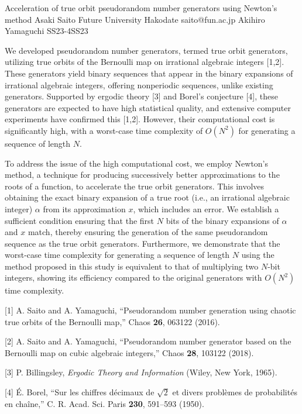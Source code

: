 \begin{talk}
  {Acceleration of true orbit pseudorandom number generators using Newton's method}%
  {Asaki Saito}%
  {Future University Hakodate}%
  {saito@fun.ac.jp}%
  {Akihiro Yamaguchi}%
{}{}{SS23-4}{SS23}


We developed pseudorandom number generators, termed true orbit
generators, utilizing true orbits of the Bernoulli map on irrational
algebraic integers [1,2].
These generators yield binary sequences that appear in the binary
expansions of irrational algebraic integers, offering nonperiodic
sequences, unlike existing generators.
Supported by ergodic theory [3] and Borel's conjecture [4], these
generators are expected to have high statistical quality, and
extensive computer experiments have confirmed this [1,2].
However, their computational cost is significantly high, with a
worst-case time complexity of $O(N^2)$ for generating a sequence of
length $N$.

To address the issue of the high computational cost, we employ Newton's method, a technique for
producing successively better approximations to the roots of a
function, to accelerate the true orbit generators.
This involves obtaining the exact binary expansion of a true root
(i.e., an irrational algebraic integer) $\alpha$ from its
approximation $x$, which includes an error.
We establish a sufficient condition ensuring that the first $N$ bits
of the binary expansions of $\alpha$ and $x$ match, thereby ensuring
the generation of the same pseudorandom sequence as the true orbit
generators.
Furthermore, we demonstrate that the worst-case time complexity for
generating a sequence of length $N$ using the method proposed in this
study is equivalent to that of multiplying two $N$-bit integers,
showing its efficiency compared to the original generators with
$O(N^2)$ time complexity.

\medskip

[1] A. Saito and A. Yamaguchi,
``Pseudorandom number generation using chaotic true orbits of the Bernoulli map,''
Chaos {\bf 26}, 063122 (2016).

[2] A. Saito and A. Yamaguchi,
``Pseudorandom number generator based on the Bernoulli map on cubic algebraic integers,''
Chaos {\bf 28}, 103122 (2018).

[3] P. Billingsley,
{\it Ergodic Theory and Information}
(Wiley, New York, 1965).

[4] \'{E}. Borel,
``Sur les chiffres d\'{e}cimaux de $\sqrt{2}$ et divers probl\`{e}mes de
probabilit\'{e}s en cha\^{i}ne,''
C. R. Acad. Sci. Paris {\bf 230}, 591--593 (1950).
\end{talk}

